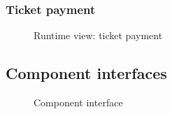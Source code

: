 \subsubsection{Ticket payment}	
	\begin{figure}[!h]
		\centering
		\caption{Runtime view: ticket payment}
	\end{figure}
	\clearpage

\subsection{Component interfaces}
	\begin{figure}[!h]
		\centering
		\caption{Component interface}
	\end{figure}
	\clearpage


